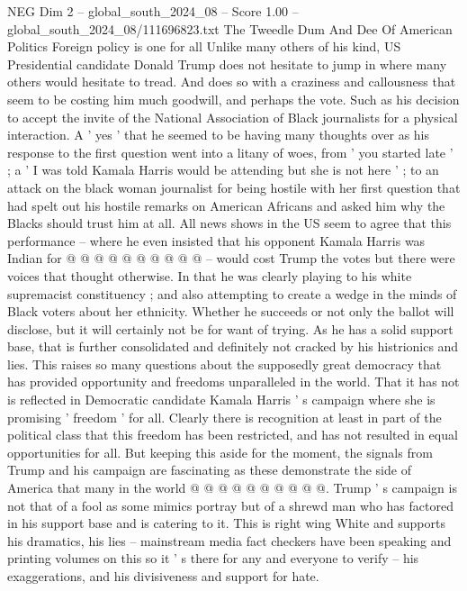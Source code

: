 \begin{textsample}{NEG Dim 2 – global\_south\_2024\_08 – Score 1.00 – global\_south\_2024\_08/111696823.txt}  \label{ex:f2_neg_425}
The Tweedle Dum And Dee Of American Politics Foreign policy is one for all Unlike many others of his kind, US Presidential candidate Donald Trump does not hesitate to jump in where many others would hesitate to tread.
And does so with a craziness and callousness that seem to be costing him much goodwill, and perhaps the vote.
Such as his decision to accept the invite of the National Association of Black journalists for a physical interaction.
A ' yes ' that he seemed to be having many thoughts over as his response to the first question went into a litany of woes, from ' you started late ' ; a ' I was told Kamala Harris would be attending but she is not here ' ; to an attack on the black woman journalist for being hostile with her first question that had spelt out his hostile remarks on American Africans and asked him why the Blacks should trust him at all.
All news shows in the US seem to agree that this performance -- where he even insisted that his opponent Kamala Harris was Indian for @ @ @ @ @ @ @ @ @ @ -- would cost Trump the votes but there were voices that thought otherwise.
In that he was clearly playing to his white supremacist constituency ; and also attempting to create a wedge in the minds of Black voters about her ethnicity.
Whether he succeeds or not only the ballot will disclose, but it will certainly not be for want of trying.
As he has a solid support base, that is further consolidated and definitely not cracked by his histrionics and lies.
This raises so many questions about the supposedly great democracy that has provided opportunity and freedoms unparalleled in the world.
That it has not is reflected in Democratic candidate Kamala Harris ' s campaign where she is promising ' freedom ' for all.
Clearly there is recognition at least in part of the political class that this freedom has been restricted, and has not resulted in equal opportunities for all.
But keeping this aside for the moment, the signals from Trump and his campaign are fascinating as these demonstrate the side of America that many in the world @ @ @ @ @ @ @ @ @ @.
Trump ' s campaign is not that of a fool as some mimics portray but of a shrewd man who has factored in his support base and is catering to it.
This is right wing White and supports his dramatics, his lies -- mainstream media fact checkers have been speaking and printing volumes on this so it ' s there for any and everyone to verify -- his exaggerations, and his divisiveness and support for hate.

\end{textsample}
